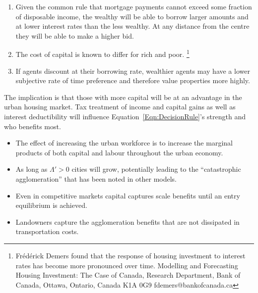 \begin{enumerate}
\item Given the  common rule that mortgage payments cannot exceed some fraction of disposable income, the wealthy will be able to borrow larger amounts and at lower interest rates than the less wealthy. At any distance from the centre they will be able to make a higher bid.

\item The cost of capital is known to differ for rich and poor. \footnote{Fr\'ed\'erick Demers found that the response of housing investment to interest rates has become more pronounced over time. Modelling and Forecasting Housing Investment: The Case of Canada,  Research Department, Bank of Canada, Ottawa, Ontario, Canada K1A 0G9 fdemers@bankofcanada.ca} 


\item If agents discount at their borrowing rate, wealthier agents may have a lower subjective rate of time preference and therefore value properties more highly. 
\end{enumerate}
The implication is that those with more capital will be at an advantage in the urban housing  market. Tax treatment of income and capital gains as well as interest deductibility will influence Equation~\ref{Eqn:DecisionRule}'s strength and who benefits most. 



\begin{itemize}
\item The effect of increasing the urban workforce is to increase the marginal products of  both capital and labour throughout the urban economy.%
 \item  As long as $\Lambda'>0$ cities will  grow, potentially leading to the ``catastrophic agglomeration''  that has been noted in other models.  %
\item Even in competitive markets capital captures  scale benefits until an entry equilibrium is achieved.
\item Landowners  capture the agglomeration benefits that are not dissipated in transportation costs.
\end{itemize}

